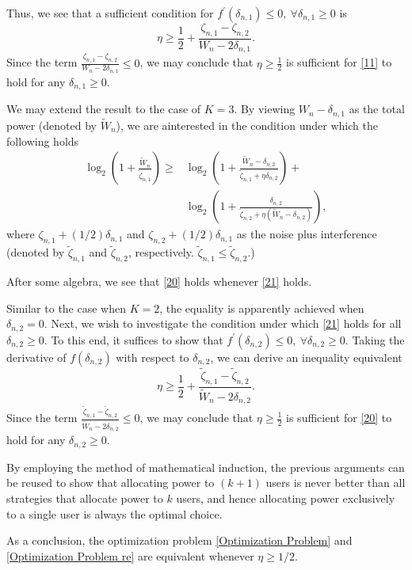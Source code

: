 \documentclass[a4paper,journal,10pt]{IEEEtran}
\newcounter{tempEqCounter}
\begin{document}
\begin{IEEEproof}
Thus, we see that a sufficient condition for $f^{\prime}(\delta_{n,1})\leq 0, ~\forall \delta_{n,1}\geq 0$ is
\setcounter{tempEqCounter}{\value{equation}}
\setcounter{equation}{13}
\begin{equation}\label{eta}
    \eta \ge \frac{1}{2}+\frac{\zeta_{n,1}-\zeta_{n,2}}{W_n-2\delta_{n,1}}.
\end{equation}
Since the term $\frac{\zeta_{n,1}-\zeta_{n,2}}{W_n-2\delta_{n,1}}\leq 0$, we may conclude that $\eta \ge \frac{1}{2}$ is sufficient for \eqref{11} to hold for any $\delta_{n,1}\geq 0$. 

We may extend the result to the case of $K=3$. 
By viewing $W_n-\delta_{n,1}$ as the total power (denoted by $\widetilde{W}_n$), we are ainterested in the condition under which the following holds
\setcounter{tempEqCounter}{\value{equation}}
\setcounter{equation}{14}
\begin{align}\label{20}
        \log_2 \left(1\!+\!\frac{\widetilde{W}_n}{\widetilde{\zeta}_{n,1}}\right)\!\ge &\! \log_2 \left(1+\frac{\widetilde{W}_n-\delta_{n,2}}{\widetilde{\zeta}_{n,1}\!+\!\eta \delta_{n,2}}\right) 
        \!+\\ \nonumber
        &\!\log_2 \left(1\!+\!\frac{\delta_{n,2}}{\widetilde{\zeta}_{n,2}+\eta(\widetilde{W}_n -\delta_{n,2})} \right),
\end{align}
where $\zeta_{n,1}+(1/2)\delta_{n,1}$ and $\zeta_{n,2}+(1/2)\delta_{n,1}$ as the noise plus interference (denoted by $\widetilde{\zeta}_{n,1}$ and $\widetilde{\zeta}_{n,2}$, respectively. $\widetilde{\zeta}_{n,1}\leq \widetilde{\zeta}_{n,2}$.)

After some algebra, we see that \eqref{20} holds whenever \eqref{21} holds. 

Similar to the case when $K=2$, the equality is apparently achieved when $\delta_{n,2}=0$. Next, we wish to investigate the condition under which \eqref{21} holds for all $\delta_{n,2}\geq 0$. To this end, it suffices to show that $f^{\prime}(\delta_{n,2})\leq 0, ~\forall \delta_{n,2}\geq 0$. Taking the derivative of $f(\delta_{n,2})$ with respect to $\delta_{n,2}$, we can derive an inequality equivalent
\setcounter{equation}{16}
\begin{equation}\label{eta2}
    \eta \ge \frac{1}{2}+\frac{\widetilde{\zeta}_{n,1}-\widetilde{\zeta}_{n,2}}{\widetilde{W}_n-2\delta_{n,2}}.
\end{equation}
Since the term $\frac{\widetilde{\zeta}_{n,1}-\widetilde{\zeta}_{n,2}}{\widetilde{W}_n-2\delta_{n,2}}\leq 0$, we may conclude that $\eta \ge \frac{1}{2}$ is sufficient for \eqref{20} to hold for any $\delta_{n,2}\geq 0$. 

By employing the method of mathematical induction, the previous arguments can be reused to show that allocating power to $(k+1)$ users is never better than all strategies that allocate power to $k$ users, and hence allocating power exclusively to a single user is always the optimal choice. 

As a conclusion, the optimization problem \eqref{Optimization Problem} and \eqref{Optimization Problem re} are equivalent whenever $\eta \geq 1/2$.
\end{IEEEproof}
\end{document}
